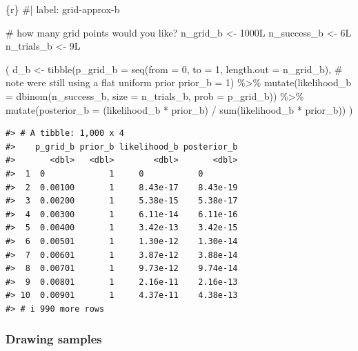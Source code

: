 \documentclass[
  letterpaper,
  DIV=11,
  numbers=noendperiod]{scrreprt}
\newenvironment{Shaded}{\begin{snugshade}}{\end{snugshade}}
\newcommand{\AttributeTok}[1]{\textcolor[rgb]{0.40,0.45,0.13}{#1}}
\newcommand{\CommentTok}[1]{\textcolor[rgb]{0.37,0.37,0.37}{#1}}
\newcommand{\DecValTok}[1]{\textcolor[rgb]{0.68,0.00,0.00}{#1}}
\newcommand{\FunctionTok}[1]{\textcolor[rgb]{0.28,0.35,0.67}{#1}}
\newcommand{\InformationTok}[1]{\textcolor[rgb]{0.37,0.37,0.37}{#1}}
\newcommand{\NormalTok}[1]{\textcolor[rgb]{0.00,0.23,0.31}{#1}}
\newcommand{\OtherTok}[1]{\textcolor[rgb]{0.00,0.23,0.31}{#1}}
\newcommand{\SpecialCharTok}[1]{\textcolor[rgb]{0.37,0.37,0.37}{#1}}
\begin{document}
\begin{Shaded}
\begin{Highlighting}[]
\InformationTok{\textasciigrave{}\textasciigrave{}\textasciigrave{}\{r\}}
\CommentTok{\#| label: grid{-}approx{-}b}

\CommentTok{\# how many grid points would you like?}
\NormalTok{n\_grid\_b }\OtherTok{\textless{}{-}}\NormalTok{ 1000L}
\NormalTok{n\_success\_b }\OtherTok{\textless{}{-}}\NormalTok{ 6L}
\NormalTok{n\_trials\_b  }\OtherTok{\textless{}{-}}\NormalTok{ 9L}

\NormalTok{(}
\NormalTok{  d\_b }\OtherTok{\textless{}{-}}
  \FunctionTok{tibble}\NormalTok{(}\AttributeTok{p\_grid\_b =} \FunctionTok{seq}\NormalTok{(}\AttributeTok{from =} \DecValTok{0}\NormalTok{, }\AttributeTok{to =} \DecValTok{1}\NormalTok{, }\AttributeTok{length.out =}\NormalTok{ n\_grid\_b),}
         \CommentTok{\# note we\textquotesingle{}re still using a flat uniform prior}
         \AttributeTok{prior\_b  =} \DecValTok{1}\NormalTok{) }\SpecialCharTok{\%\textgreater{}\%} 
  \FunctionTok{mutate}\NormalTok{(}\AttributeTok{likelihood\_b =} \FunctionTok{dbinom}\NormalTok{(n\_success\_b, }\AttributeTok{size =}\NormalTok{ n\_trials\_b, }\AttributeTok{prob =}\NormalTok{ p\_grid\_b)) }\SpecialCharTok{\%\textgreater{}\%} 
  \FunctionTok{mutate}\NormalTok{(}\AttributeTok{posterior\_b =}\NormalTok{ (likelihood\_b }\SpecialCharTok{*}\NormalTok{ prior\_b) }\SpecialCharTok{/} \FunctionTok{sum}\NormalTok{(likelihood\_b }\SpecialCharTok{*}\NormalTok{ prior\_b))}
\NormalTok{)}
\InformationTok{\textasciigrave{}\textasciigrave{}\textasciigrave{}}
\end{Highlighting}
\end{Shaded}

\begin{verbatim}
#> # A tibble: 1,000 x 4
#>    p_grid_b prior_b likelihood_b posterior_b
#>       <dbl>   <dbl>        <dbl>       <dbl>
#>  1  0             1     0           0       
#>  2  0.00100       1     8.43e-17    8.43e-19
#>  3  0.00200       1     5.38e-15    5.38e-17
#>  4  0.00300       1     6.11e-14    6.11e-16
#>  5  0.00400       1     3.42e-13    3.42e-15
#>  6  0.00501       1     1.30e-12    1.30e-14
#>  7  0.00601       1     3.87e-12    3.88e-14
#>  8  0.00701       1     9.73e-12    9.74e-14
#>  9  0.00801       1     2.16e-11    2.16e-13
#> 10  0.00901       1     4.37e-11    4.38e-13
#> # i 990 more rows
\end{verbatim}

\hypertarget{drawing-samples-1}{%
\subsubsection{Drawing samples}\label{drawing-samples-1}}
\end{document}
